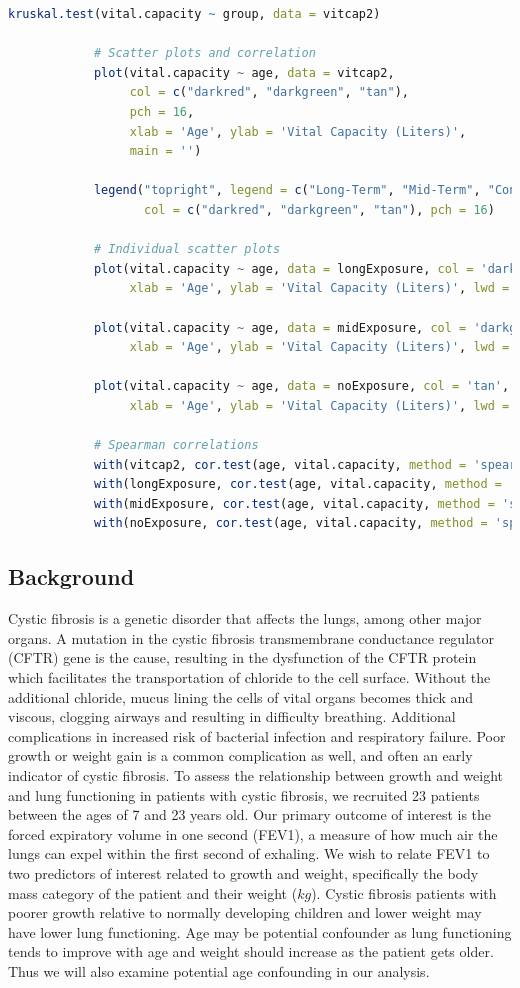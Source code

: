 \documentclass{article}
\begin{document}
\begin{lstlisting}[language=R, basicstyle=\footnotesize\ttfamily, breaklines=true]
			kruskal.test(vital.capacity ~ group, data = vitcap2)
			
			# Scatter plots and correlation
			plot(vital.capacity ~ age, data = vitcap2, 
				 col = c("darkred", "darkgreen", "tan"),
				 pch = 16,
				 xlab = 'Age', ylab = 'Vital Capacity (Liters)', 
				 main = '')
			
			legend("topright", legend = c("Long-Term", "Mid-Term", "Control"),
				   col = c("darkred", "darkgreen", "tan"), pch = 16)
			
			# Individual scatter plots
			plot(vital.capacity ~ age, data = longExposure, col = 'darkred',
				 xlab = 'Age', ylab = 'Vital Capacity (Liters)', lwd = 2)
			
			plot(vital.capacity ~ age, data = midExposure, col = 'darkgreen',
				 xlab = 'Age', ylab = 'Vital Capacity (Liters)', lwd = 2)
			
			plot(vital.capacity ~ age, data = noExposure, col = 'tan',
				 xlab = 'Age', ylab = 'Vital Capacity (Liters)', lwd = 2)
			
			# Spearman correlations
			with(vitcap2, cor.test(age, vital.capacity, method = 'spearman' ))
			with(longExposure, cor.test(age, vital.capacity, method = 'spearman' ))
			with(midExposure, cor.test(age, vital.capacity, method = 'spearman' ))
			with(noExposure, cor.test(age, vital.capacity, method = 'spearman' ))
			\end{lstlisting}


		\newpage
		\subsection*{Background}
		
		Cystic fibrosis is a genetic disorder that affects the lungs, among other major organs. A mutation in the cystic fibrosis transmembrane conductance regulator (CFTR) gene is the cause, resulting in the dysfunction of the CFTR protein which facilitates the transportation of chloride to the cell surface. Without the additional chloride, mucus lining the cells of vital organs becomes thick and viscous, clogging airways and resulting in difficulty breathing. Additional complications in increased risk of bacterial infection and respiratory failure. Poor growth or weight gain is a common complication as well, and often an early indicator of cystic fibrosis. To assess the relationship between growth and weight and lung functioning in patients with cystic fibrosis, we recruited 23 patients between the ages of 7 and 23 years old. Our primary outcome of interest is the forced expiratory volume in one second (FEV1), a measure of how much air the lungs can expel within the first second of exhaling. We wish to relate FEV1 to two predictors of interest related to growth and weight, specifically the body mass category of the patient and their weight ($kg$). Cystic fibrosis patients with poorer growth relative to normally developing children and lower weight may have lower lung functioning. Age may be potential confounder as lung functioning tends to improve with age and weight should increase as the patient gets older. Thus we will also examine potential age confounding in our analysis.
\end{document}
